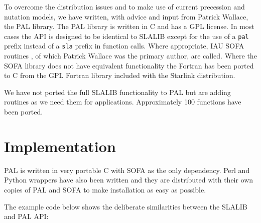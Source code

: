 To overcome the distribution issues and to make use of current precession and nutation models, we have written, with advice and input from Patrick Wallace, the PAL library. The PAL library is written in C and has a GPL license. In most cases the API is designed to be identical to SLALIB except for the use of a \texttt{pal} prefix instead of a \texttt{sla} prefix in function calls. Where appropriate, IAU SOFA routines \citep{Hohenkerk:2010,1996ASPC..101..207W}, of which Patrick Wallace was the primary author, are called. Where the SOFA library does not have equivalent functionality the Fortran has been ported to C from the GPL Fortran library included with the Starlink distribution.

We have not ported the full SLALIB functionality to PAL but are adding routines as we need them for applications. Approximately 100 functions have been ported.

\section{Implementation}

PAL is written in very portable C with SOFA as the only dependency. Perl and Python wrappers have also been written and they are distributed with their own copies of PAL and SOFA to make installation as easy as possible.

The example code below shows the deliberate similarities between the SLALIB and PAL API:

